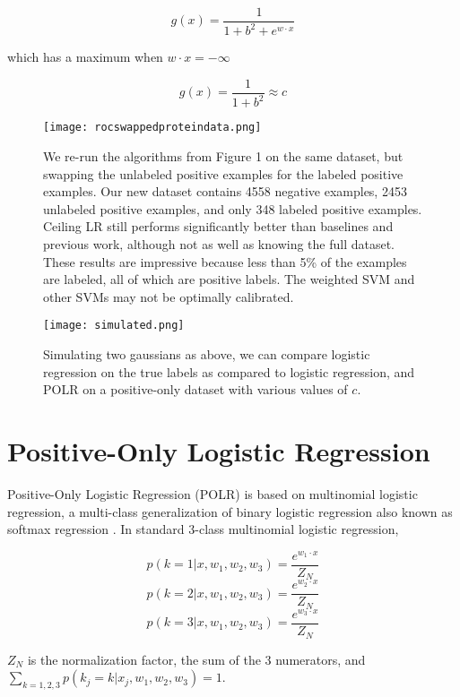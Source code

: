 \documentclass{article}
\begin{document}
$$g(x) = \frac{1}{1 + b^2 + e^{w \cdot x}}$$

which has a maximum when $w \cdot x=-\infty$

$$g(x) = \frac{1}{1 + b^2} \approx c$$

\begin{figure*}[ht!]
\vskip 0.2in
\begin{center}
\centerline{\texttt{[image: rocswappedproteindata.png]}}
\caption{We re-run the algorithms from Figure 1 on the same dataset, but swapping the unlabeled positive examples for the labeled positive examples. Our new dataset contains 4558 negative examples, 2453 unlabeled positive examples, and only 348 labeled positive examples.  Ceiling LR still performs significantly better than baselines and previous work, although not as well as knowing the full dataset.  These results are impressive because less than 5\% of the examples are labeled, all of which are positive labels. The weighted SVM and other SVMs may not be optimally calibrated.}
\label{rocswapped}
\end{center}
\vskip -0.2in
\end{figure*}

\begin{figure*}[ht!]
\vskip 0.2in
\begin{center}
\centerline{\texttt{[image: simulated.png]}}
\caption{Simulating two gaussians as above, we can compare logistic regression on the true labels as compared to logistic regression, and POLR on a positive-only dataset with various values of $c$.}
\label{synthetic}
\end{center}
\vskip -0.2in
\end{figure*}

\section{Positive-Only Logistic Regression}

Positive-Only Logistic Regression (POLR) is based on multinomial logistic regression, a multi-class generalization of binary logistic regression also known as softmax regression \cite{renie05}.  In standard 3-class multinomial logistic regression,

$$p(k=1 | x, w_1, w_2, w_3) =  \frac{e^{w_1 \cdot x}}{Z_N}$$
$$p(k=2 | x, w_1, w_2, w_3) =  \frac{e^{w_2 \cdot x}}{Z_N}$$
$$p(k=3 | x, w_1, w_2, w_3) =  \frac{e^{w_3 \cdot x}}{Z_N}$$

$Z_N$ is the normalization factor, the sum of the 3 numerators, and $\sum_{k=1,2,3}{p(k_j=k|x_j, w_1, w_2, w_3)} = 1$.
\end{document}
